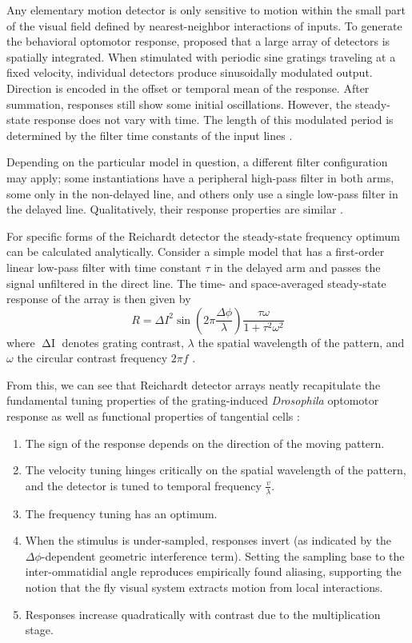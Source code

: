 Any elementary motion detector is only sensitive to motion within the small part of the visual field defined by nearest-neighbor interactions of inputs. To generate the behavioral optomotor response, \citet{Hassenstein:1956fa} proposed that a large array of detectors is spatially integrated. When stimulated with periodic sine gratings traveling at a fixed velocity, individual detectors produce sinusoidally modulated output. Direction is encoded in the offset or temporal mean of the response. After summation, responses still show some initial oscillations. However, the steady-state response does not vary with time. The length of this modulated period is determined by the filter time constants of the input lines \citep{Egelhaaf:1989wf,Egelhaaf:1989wd}.

Depending on the particular model in question, a different filter configuration may apply; some instantiations have a peripheral high-pass filter in both arms, some only in the non-delayed line, and others only use a single low-pass filter in the delayed line. Qualitatively, their response properties are similar \citep{Borst:2003bz}.

For specific forms of the Reichardt detector the steady-state frequency optimum can be calculated analytically. Consider a simple model that has a first-order linear low-pass filter with time constant $\tau$ in the delayed arm and passes the signal unfiltered in the direct line. The time- and space-averaged steady-state response of the array is then given by
\begin{equation}
    R = {\Delta I}^2 \sin(2 \pi \frac{\Delta\phi}{\lambda}) \frac{\tau \omega}{1 + \tau^2 \omega^2}
\end{equation}
where $\mathop{\Delta I}$ denotes grating contrast, $\lambda$ the spatial wavelength of the pattern, and $\omega$ the circular contrast frequency $2 \pi f$ \citep{Borst:2003bz}.

From this, we can see that Reichardt detector arrays neatly recapitulate the fundamental tuning properties of the grating-induced \textit{Drosophila} optomotor response \citep{Gotz:1964bj} as well as functional properties of tangential cells \citep{Joesch:2008fo}:

\begin{enumerate}
    \item The sign of the response depends on the direction of the moving pattern.
    \item The velocity tuning hinges critically on the spatial wavelength of the pattern, and the detector is tuned to temporal frequency $\frac{v}{\lambda}$.
    \item The frequency tuning has an optimum.
    \item When the stimulus is under-sampled, responses invert (as indicated by the $\Delta\phi$-dependent geometric interference term). Setting the sampling base to the inter-ommatidial angle reproduces empirically found aliasing, supporting the notion that the fly visual system extracts motion from local interactions.
    \item Responses increase quadratically with contrast due to the multiplication stage.
\end{enumerate}


